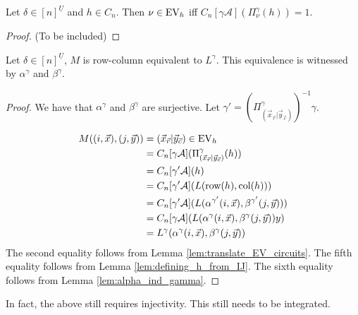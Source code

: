 \documentclass[../paper.tex]{subfiles}
\begin{document}
\begin{lem}
  Let $\delta \in [n]^{\underline{U}}$ and $h \in C_n$. Then $\nu \in \text{EV}_h$ iff
  $C_n[\gamma \mathcal{A}](\Pi^{\gamma}_\nu (h)) = 1$.
  \label{lem:translate_EV_circuits}
\end{lem}
\begin{proof}
  (To be included)
\end{proof}

\begin{thm}
  Let $\delta \in [n]^{\underline{U}}$, $M$ is row-column equivalent to
  $L^{\gamma}$. This equivalence is witnessed by $\alpha^{\gamma}$ and
  $\beta^{\gamma}$.
\end{thm}
\begin{proof}
  We have that $\alpha^{\gamma}$ and $\beta^{\gamma}$ are surjective. Let
  $\gamma' = (\Pi^{\gamma}_{(\vec{x}_{\vec{r}} \vert \vec{y}_{\vec{c}})})^{-1}
  \gamma$.

  \begin{align*}
    M((i, \vec{x}), (j, \vec{y}))
    &= (\vec{x}_{\vec{r}} \vert \vec{y}_{\vec{c}}) \in \text{EV}_h \\
    &= C_n[\gamma \mathcal{A}] (\Pi^{\gamma}_{(\vec{x}_{\vec{r}} \vert \vec{y}_{\vec{c}})} (h)) \\
    &= C_n[\gamma' \mathcal{A}] (h) \\
    &= C_n[\gamma' \mathcal{A}](L(\text{row}(h), \text{col} (h)))\\
    &= C_n[\gamma' \mathcal{A}](L(\alpha^{\gamma'}(i, \vec{x}), \beta^{\gamma'}(j, \vec{y})))\\
    &= C_n[\gamma \mathcal{A}](L(\alpha^{\gamma}(i, \vec{x}), \beta^{\gamma}(j, \vec{y}))y)\\
    &= L^{\gamma}(\alpha^{\gamma}(i, \vec{x}), \beta^{\gamma}(j, \vec{y}))
  \end{align*}
  The second equality follows from Lemma \ref{lem:translate_EV_circuits}. The
  fifth equality follows from Lemma \ref{lem:defining_h_from_IJ}. The sixth
  equality follows from Lemma \ref{lem:alpha_ind_gamma}.
\end{proof}

\begin{remark}
  In fact, the above still requires injectivity. This still needs to be integrated.
\end{remark}


\end{document}
